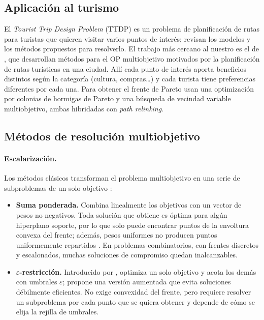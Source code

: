 \subsection{Aplicación al turismo}

El \emph{Tourist Trip Design Problem} (TTDP) es un problema de planificación de rutas para turistas que quieren visitar varios puntos de interés; \citet{gavalas2014} revisan los modelos y los métodos propuestos para resolverlo. El trabajo más cercano al nuestro es el de \citet{schilde2009}, que desarrollan métodos para el OP multiobjetivo motivados por la planificación de rutas turísticas en una ciudad. Allí cada punto de interés aporta beneficios distintos según la categoría (cultura, compras…) y cada turista tiene preferencias diferentes por cada una. Para obtener el frente de Pareto usan una optimización por colonias de hormigas de Pareto y una búsqueda de vecindad variable multiobjetivo, ambas hibridadas con \emph{path relinking}.

\subsection{Métodos de resolución multiobjetivo}

\paragraph{Escalarización.} Los métodos clásicos transforman el problema multiobjetivo en una serie de subproblemas de un solo objetivo \citep{miettinen1999,ehrgott2005}:
\begin{itemize}
  \item \textbf{Suma ponderada.} Combina linealmente los objetivos con un vector de pesos no negativos. Toda solución que obtiene es óptima para algún hiperplano soporte, por lo que solo puede encontrar puntos de la envoltura convexa del frente; además, pesos uniformes no producen puntos uniformemente repartidos \citep{dasdennis1997}. En problemas combinatorios, con frentes discretos y escalonados, muchas soluciones de compromiso quedan inalcanzables.
  \item \textbf{$\varepsilon$-restricción.} Introducido por \citet{haimes1971}, optimiza un solo objetivo y acota los demás con umbrales $\varepsilon$; \citet{mavrotas2009} propone una versión aumentada que evita soluciones débilmente eficientes. No exige convexidad del frente, pero requiere resolver un subproblema por cada punto que se quiera obtener y depende de cómo se elija la rejilla de umbrales.
\end{itemize}

